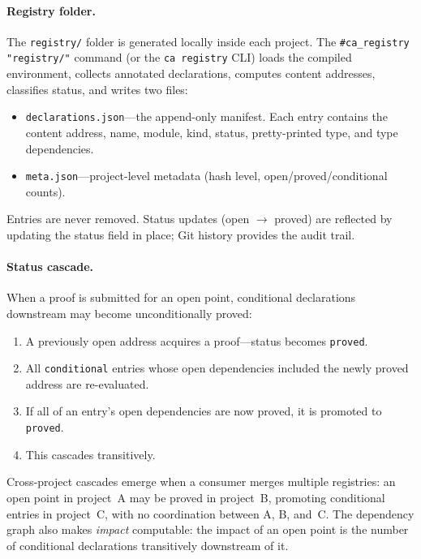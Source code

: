\paragraph{Registry folder.}
The \texttt{registry/} folder is generated locally inside each project.
The \texttt{\#ca\_registry "registry/"} command (or the \texttt{ca
registry} CLI) loads the compiled environment, collects annotated
declarations, computes content addresses, classifies status, and writes
two files:

\begin{itemize}[nosep]
  \item \texttt{declarations.json}---the append-only manifest.  Each
    entry contains the content address, name, module, kind, status,
    pretty-printed type, and type dependencies.
  \item \texttt{meta.json}---project-level metadata (hash level,
    open/proved/conditional counts).
\end{itemize}

Entries are never removed.  Status updates (open $\to$ proved) are
reflected by updating the status field in place; Git history provides
the audit trail.

\paragraph{Status cascade.}
When a proof is submitted for an open point, conditional declarations
downstream may become unconditionally proved:

\begin{enumerate}[nosep]
  \item A previously open address acquires a proof---status becomes
    \texttt{proved}.
  \item All \texttt{conditional} entries whose open dependencies
    included the newly proved address are re-evaluated.
  \item If all of an entry's open dependencies are now proved, it is
    promoted to \texttt{proved}.
  \item This cascades transitively.
\end{enumerate}

Cross-project cascades emerge when a consumer merges multiple
registries: an open point in project~A may be proved in project~B,
promoting conditional entries in project~C, with no coordination
between A, B, and~C.  The dependency graph also makes \emph{impact}
computable: the impact of an open point is the number of conditional
declarations transitively downstream of it.

